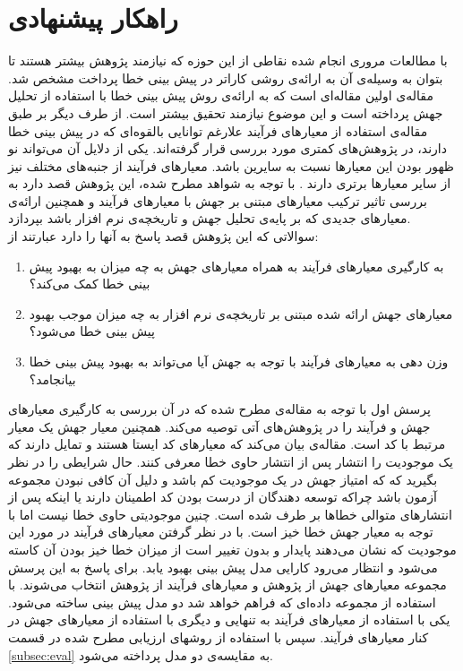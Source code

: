 \section{راهکار پیشنهادی}
\label{sec:method}
با  مطالعات مروری انجام شده نقاطی از این حوزه که نیازمند پژوهش بیشتر هستند تا بتوان به وسیله‌ی آن به ارائه‌ی روشی کاراتر در پیش بینی خطا پرداخت مشخص شد. مقاله‌ی \cite{bowes2016mutation} اولین مقاله‌ای است که  به ارائه‌ی روش پیش بینی خطا با استفاده از تحلیل جهش پرداخته است و این موضوع نیازمند تحقیق بیشتر است. از طرف دیگر بر طبق مقاله‌ی \cite{radjenovic2013software} استفاده از معیارهای فرآیند علارغم توانایی بالقوه‌ای که در پیش بینی خطا دارند، در پژوهش‌های کمتری مورد بررسی قرار گرفته‌اند. یکی از دلایل آن می‌تواند نو ظهور بودن این معیارها نسبت به سایرین باشد. معیارهای فرآیند از جنبه‌های مختلف نیز از سایر معیار‌ها برتری دارند \cite{rahman2013and}. با توجه به شواهد مطرح شده، این پژوهش قصد دارد به بررسی تاثیر ترکیب معیارهای مبتنی بر جهش با معیارهای فرآیند و همچنین ارائه‌ی معیارهای جدیدی که بر پایه‌ی تحلیل جهش و تاریخچه‌ی نرم افزار باشد بپردازد.\\
سوالاتی که این پژوهش قصد پاسخ به آنها را دارد عبارتند از:

\begin{enumerate}
	\item  
	به کارگیری معیارهای فرآیند به همراه معیارهای جهش به چه میزان به بهبود پیش بینی خطا کمک می‌کند؟
	\item 
	معیارهای جهش ارائه شده مبتنی بر تاریخچه‌ی نرم افزار به چه میزان موجب بهبود پیش بینی خطا می‌شود؟
	\item 
	وزن دهی به معیارهای فرآیند با توجه به جهش آیا می‌تواند به بهبود پیش بینی خطا بیانجامد؟  
\end{enumerate}

پرسش اول با توجه به مقاله‌ی \cite{bowes2016mutation} مطرح شده که در آن بررسی به کارگیری معیارهای جهش و فرآیند را در پژوهش‌های آتی توصیه می‌کند.  همچنین  معیار جهش یک معیار  مرتبط با کد است. مقاله‌ی \cite{rahman2013and}  بیان می‌کند که معیارهای کد ایستا هستند و تمایل دارند که یک موجودیت را انتشار پس از انتشار حاوی خطا معرفی کنند. حال شرایطی را در نظر بگیرید که که امتیاز جهش در یک موجودیت کم باشد و دلیل آن کافی نبودن مجموعه آزمون باشد چراکه توسعه دهندگان از درست بودن کد اطمینان دارند یا اینکه پس از انتشارهای متوالی خطاها بر طرف شده است. چنین موجودیتی حاوی خطا نیست اما با توجه به معیار جهش خطا خیز است. با در نظر گرفتن معیارهای فرآیند در مورد این موجودیت که نشان می‌دهند پایدار و بدون تغییر است از میزان خطا خیز بودن آن کاسته می‌شود و انتظار می‌رود کارایی مدل پیش بینی بهبود یابد. 
برای پاسخ به این پرسش مجموعه معیارهای جهش  از پژوهش \cite{bowes2016mutation}  و معیارهای فرآیند از پژوهش \cite{rahman2013and} انتخاب می‌شوند. با استفاده از مجموعه داده‌ای  که فراهم خواهد شد دو مدل پیش بینی ساخته می‌شود. یکی با استفاده از معیارهای فرآیند به تنهایی و دیگری با استفاده از معیارهای جهش در کنار معیارهای فرآیند. سپس  با استفاده از روشهای ارزیابی مطرح شده در قسمت \ref{subsec:eval}  به مقایسه‌ی دو مدل پرداخته می‌شود. \\

